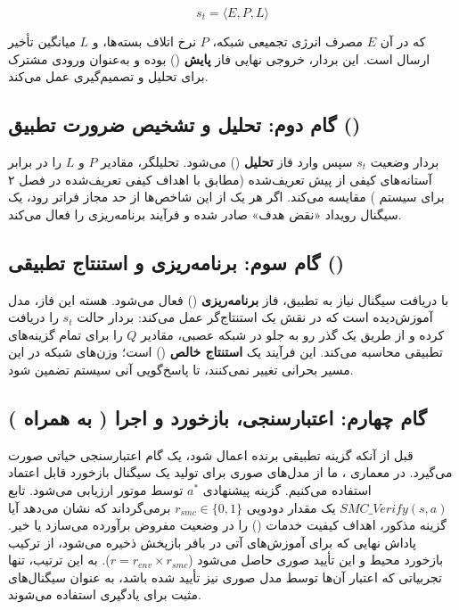 \documentclass[oneside,openany,phd]{TMU-Thesis}
\begin{document}
\begin{equation}
s_t = \langle E, P, L \rangle
\label{eq:state_vector_new}
\end{equation}

که در آن $E$ مصرف انرژی تجمیعی شبکه، $P$ نرخ اتلاف بسته‌ها، و $L$ میانگین تأخیر ارسال است. این بردار، خروجی نهایی فاز \textbf{پایش} () بوده و به‌عنوان ورودی مشترک برای تحلیل و تصمیم‌گیری عمل می‌کند.

\subsection{گام دوم: تحلیل و تشخیص ضرورت تطبیق ()}
\label{subsec:analysis-context}

بردار وضعیت $s_t$ سپس وارد فاز \textbf{تحلیل} () می‌شود. تحلیلگر، مقادیر $P$ و $L$ را در برابر آستانه‌های کیفی از پیش تعریف‌شده (مطابق با اهداف کیفی تعریف‌شده در فصل ۲ برای سیستم ) مقایسه می‌کند. اگر هر یک از این شاخص‌ها از حد مجاز فراتر رود، یک سیگنال رویداد «نقض هدف» صادر شده و فرآیند برنامه‌ریزی را فعال می‌کند.

\subsection{گام سوم: برنامه‌ریزی و استنتاج تطبیقی ()}
\label{subsec:planning-prediction}

با دریافت سیگنال نیاز به تطبیق، فاز \textbf{برنامه‌ریزی} () فعال می‌شود. هسته این فاز، مدل آموزش‌دیده  است که در نقش یک استنتاج‌گر عمل می‌کند: بردار حالت $s_t$ را دریافت کرده و از طریق یک گذر رو به جلو در شبکه عصبی، مقادیر $Q$ را برای تمام گزینه‌های تطبیقی محاسبه می‌کند. این فرآیند یک \textbf{استنتاج خالص} () است؛ وزن‌های شبکه در این مسیر بحرانی تغییر نمی‌کنند، تا پاسخ‌گویی آنی سیستم تضمین شود.


\subsection{گام چهارم: اعتبارسنجی، بازخورد و اجرا ( به همراه )}
\label{subsec:verification-execution}

قبل از آنکه گزینه تطبیقی برنده اعمال شود، یک گام اعتبارسنجی حیاتی صورت می‌گیرد. در معماری ، ما از مدل‌های صوری برای تولید یک سیگنال بازخورد قابل اعتماد استفاده می‌کنیم. گزینه پیشنهادی $a^*$ توسط موتور  ارزیابی می‌شود. تابع $SMC\_Verify(s, a)$ یک مقدار دودویی $r_{smc} \in \{0, 1\}$ برمی‌گرداند که نشان می‌دهد آیا گزینه مذکور، اهداف کیفیت خدمات () را در وضعیت مفروض برآورده می‌سازد یا خیر. پاداش نهایی که برای آموزش‌های آتی در بافر بازپخش ذخیره می‌شود، از ترکیب بازخورد محیط و این تأیید صوری حاصل می‌شود ($r = r_{env} \times r_{smc}$). به این ترتیب، تنها تجربیاتی که اعتبار آن‌ها توسط مدل صوری نیز تأیید شده باشد، به عنوان سیگنال‌های مثبت برای یادگیری استفاده می‌شوند.
\end{document}

